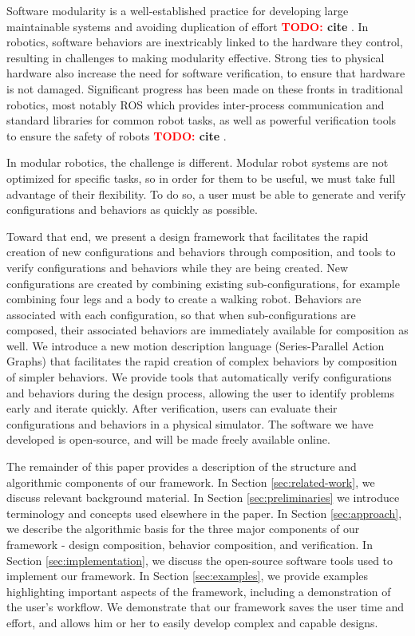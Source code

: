 \documentclass[conference]{IEEEtran}
\theoremstyle{definition}
\newcommand{\TODO}[1]{ {\bf \textcolor{red}{TODO:} #1 }}
\begin{document}
Software modularity is a well-established practice for developing large
maintainable systems and avoiding duplication of effort \TODO{cite}. In robotics, software
behaviors are inextricably linked to the hardware they control, resulting in challenges to making modularity effective. Strong
ties to physical hardware also increase the need for software verification, to ensure
that hardware is not damaged. Significant progress has been made on these fronts
in traditional robotics, most notably
ROS \cite{Quigley2009} which provides inter-process communication and standard libraries for common robot tasks,
as well as powerful verification tools to ensure the safety of robots \TODO{cite}.
  
In modular robotics, the challenge is different.  Modular robot systems are not optimized
for specific tasks, so in order for them to be useful, we must take full advantage of their flexibility. To do
so, a user must be able to generate and verify configurations and behaviors
as quickly as possible.  

Toward that end, we present a design framework that facilitates the rapid creation
of new configurations
and behaviors through composition, and tools to verify configurations and behaviors
while they are being created. New configurations are created by combining existing
sub-configurations,
for example combining four legs and a body to create a walking robot.
Behaviors are associated with each configuration, so that when sub-configurations
are composed, their associated behaviors are immediately available for composition
as well.
We introduce a new motion description language (Series-Parallel Action Graphs)
that facilitates the rapid creation of complex behaviors by composition of simpler
behaviors.
We provide tools that automatically verify configurations and behaviors during the
design process, allowing the user to identify problems early and iterate quickly.
After verification, users can  evaluate their configurations and behaviors in a physical simulator.
The software we have developed is open-source, and will be made freely available
online.

The remainder of this paper provides a  description of the
structure and algorithmic components of our framework.  In Section \ref{sec:related-work},
we discuss relevant background material.
In Section \ref{sec:preliminaries} we introduce terminology and  concepts used elsewhere in the
paper. 
In Section \ref{sec:approach}, we describe the algorithmic basis
for the three major components of our framework - design composition, behavior
composition, and verification.  In Section
\ref{sec:implementation}, we discuss the open-source software
tools used to implement our framework. In Section \ref{sec:examples}, we provide examples highlighting
important aspects of the framework, including a demonstration of the user's
workflow.  We demonstrate that our framework saves the
user time and effort, and allows him or her to easily develop complex and
capable designs.
\end{document}
